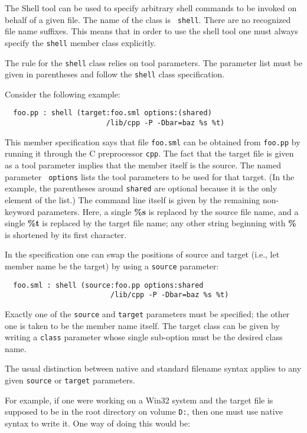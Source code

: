 \documentclass{article}
\begin{document}
The Shell tool can be used to specify arbitrary shell commands to be
invoked on behalf of a given file.  The name of the class is {\tt
shell}.  There are no recognized file name suffixes.  This means that
in order to use the shell tool one must always specify the {\tt shell}
member class explicitly.

The rule for the {\tt shell} class relies on tool parameters.  The
parameter list must be given in parentheses and follow the {\tt shell}
class specification.

Consider the following example:

\begin{verbatim}
  foo.pp : shell (target:foo.sml options:(shared)
                        /lib/cpp -P -Dbar=baz %s %t)
\end{verbatim}

This member specification says that file {\tt foo.sml} can be obtained
from {\tt foo.pp} by running it through the C preprocessor {\tt cpp}.
The fact that the target file is given as a tool parameter implies
that the member itself is the source.  The named parameter {\tt
options} lists the tool parameters to be used for that target. (In the
example, the parentheses around {\tt shared} are optional because it
is the only element of the list.) The command line itself is given by
the remaining non-keyword parameters.  Here, a single {\bf \%s} is
replaced by the source file name, and a single {\bf \%t} is replaced
by the target file name; any other string beginning with {\bf \%} is
shortened by its first character.

In the specification one can swap the positions of source and target
(i.e., let member name be the target) by using a {\tt source}
parameter:

\begin{verbatim}
  foo.sml : shell (source:foo.pp options:shared
                         /lib/cpp -P -Dbar=baz %s %t)
\end{verbatim}

Exactly one of the {\tt source} and {\tt target} parameters must be
specified; the other one is taken to be the member name itself.  The
target class can be given by writing a {\tt class} parameter whose
single sub-option must be the desired class name.

The usual distinction between native and standard filename syntax
applies to any given {\tt source} or {\tt target} parameters.

For example, if one were working on a Win32 system and the target file
is supposed to be in the root directory on volume {\tt D:},
then one must use native syntax to write it.  One way of doing this
would be:
\end{document}
